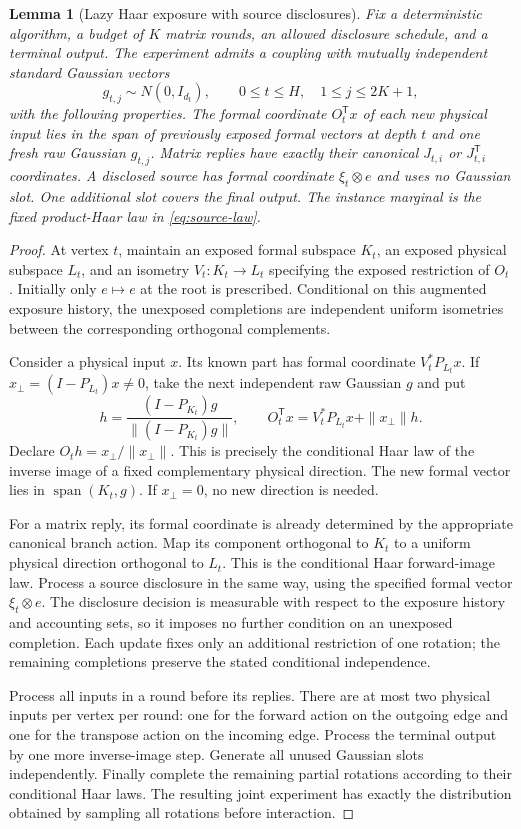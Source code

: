 \documentclass[11pt,letterpaper]{article}
\newtheorem{lemma}[theorem]{Lemma}
\theoremstyle{definition}
\theoremstyle{remark}
\begin{document}
\begin{lemma}[Lazy Haar exposure with source disclosures]
\label{lem:source-lazy}
Fix a deterministic algorithm, a budget of $K$ matrix rounds, an
allowed disclosure schedule, and a terminal output.  The experiment
admits a coupling with mutually independent standard Gaussian vectors
\[
  g_{t,j}\sim N(0,I_{d_t}),\qquad
  0\leq t\leq H,\quad 1\leq j\leq2K+1,
\]
with the following properties.  The formal coordinate $O_t^{\mathsf T}x$
of each new physical input lies in the span of previously exposed
formal vectors at depth $t$ and one fresh raw Gaussian $g_{t,j}$.
Matrix replies have exactly their canonical $J_{t,i}$ or
$J_{t,i}^{\mathsf T}$ coordinates.  A disclosed source has formal
coordinate $\xi_t\otimes e$ and uses no Gaussian slot.  One
additional slot covers the final output.  The instance marginal is
the fixed product-Haar law in \eqref{eq:source-law}.
\end{lemma}

\begin{proof}
At vertex $t$, maintain an exposed formal subspace $K_t$, an
exposed physical subspace $L_t$, and an isometry
$V_t:K_t\to L_t$ specifying the exposed restriction of $O_t$.
Initially only $e\mapsto e$ at the root is prescribed.
Conditional on this augmented exposure history, the unexposed
completions are independent uniform isometries between the
corresponding orthogonal complements.

Consider a physical input $x$.  Its known part has formal coordinate
$V_t^*P_{L_t}x$.  If $x_\perp=(I-P_{L_t})x\neq0$, take the next
independent raw Gaussian $g$ and put
\[
  h=\frac{(I-P_{K_t})g}{\|(I-P_{K_t})g\|},
  \qquad
  O_t^{\mathsf T}x=V_t^*P_{L_t}x+\|x_\perp\|h.
\]
Declare $O_th=x_\perp/\|x_\perp\|$.  This is precisely the
conditional Haar law of the inverse image of a fixed complementary
physical direction.  The new formal vector lies in
$\operatorname{span}(K_t,g)$.  If $x_\perp=0$, no new direction is
needed.

For a matrix reply, its formal coordinate is already determined by
the appropriate canonical branch action.  Map its component
orthogonal to $K_t$ to a uniform physical direction orthogonal to
$L_t$.  This is the conditional Haar forward-image law.  Process a
source disclosure in the same way, using the specified formal vector
$\xi_t\otimes e$.  The disclosure decision is measurable with
respect to the exposure history and accounting sets, so it imposes
no further condition on an unexposed completion.  Each update fixes
only an additional restriction of one rotation; the remaining
completions preserve the stated conditional independence.

Process all inputs in a round before its replies.  There are at
most two physical inputs per vertex per round: one for the forward
action on the outgoing edge and one for the transpose action on
the incoming edge.  Process the terminal output by one more
inverse-image step.  Generate all unused Gaussian slots independently.
Finally complete the remaining partial rotations according to their
conditional Haar laws.  The resulting joint experiment has exactly
the distribution obtained by sampling all rotations before
interaction.
\end{proof}
\end{document}

